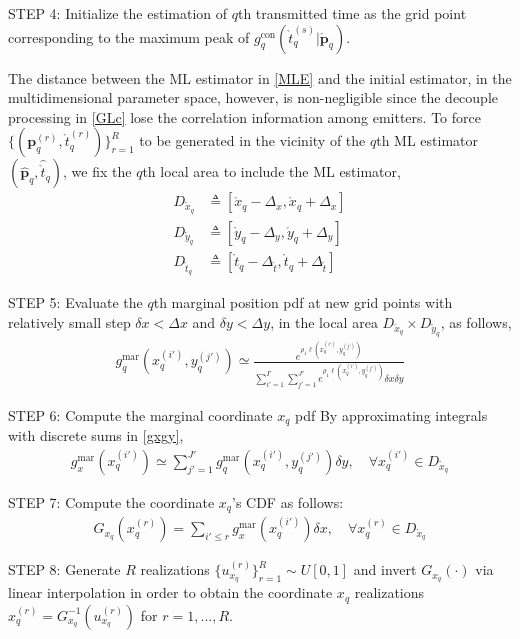\documentclass[review]{elsarticle}
\begin{document}
STEP 4: Initialize the estimation of $q$th transmitted time as the grid point corresponding to the maximum peak of $g_{q}^{\text{con}}(\mathring{t}_q^{(s)} \vert \mathring{\boldsymbol{p}}_q)$.

The distance between the ML estimator in \eqref{MLE} and the initial estimator, in the multidimensional parameter space, however, is non-negligible since the decouple processing in \eqref{GLc} lose the correlation information among emitters. To force $\lbrace(\boldsymbol{p}_q^{(r)},\mathring{t}_q^{(r)})\rbrace_{r=1}^{R}$ to be generated in the vicinity of the $q$th ML estimator $(\hat{\boldsymbol{p}}_q,\hat{\mathring{t}}_q)$, we fix the $q$th local area to include the ML estimator,
\begin{align}
    D_{\mathring{x}_q}&\triangleq[\mathring{x}_q-\Delta_x,\mathring{x}_q+\Delta_x]\\
    D_{\mathring{y}_q}&\triangleq[\mathring{y}_q-\Delta_y,\mathring{y}_q+\Delta_y]\\
    D_{\mathring{t}_q}&\triangleq[\mathring{t}_q-\Delta_{\mathring{t}},\mathring{t}_q+\Delta_{\mathring{t}}]
\end{align}

STEP 5: Evaluate the $q$th marginal position pdf at new grid points with relatively small step $\delta x<\Delta x$ and $\delta y<\Delta y$, in the local area $D_{\mathring{x}_q}\times D_{\mathring{y}_q}$, as follows,
\begin{align}
    g_{q}^{\text{mar}}(x_q^{(i')},y_q^{(j')})\simeq\frac{e^{\rho_1\ell (x_q^{(i')},y_q^{(j')})}}{\sum_{i'=1}^{I'}\sum_{j'=1}^{J'}e^{\rho_1\ell (x_q^{(i')},y_q^{(j')})}\delta x\delta y}
\end{align}

STEP 6: Compute the marginal coordinate $x_q$ pdf By approximating integrals with discrete sums in \eqref{gxgy},
\begin{align}
    g_{x}^{\text{mar}}(x_q^{(i')})\simeq \sum_{j'=1}^{J'} g_{q}^{\text{mar}}(x_q^{(i')},y_q^{(j')})\delta y, \quad \forall x_q^{(i')}\in D_{\mathring{x}_q}
\end{align}

STEP 7: Compute the coordinate $x_q$'s CDF as follows:
\begin{align}\label{Gxq}
    G_{x_q}(x_q^{(r)})=\sum_{i'\leq r} g_{x}^{\text{mar}}(x_q^{(i')})\delta x, \quad \forall x_q^{(r)}\in D_{\mathring{x}_q} 
\end{align}

STEP 8: Generate $R$ realizations $\lbrace u_{x_q}^{(r)}\rbrace_{r=1}^R\sim U[0,1]$ and invert $G_{x_q}(\cdot)$ via linear interpolation in order to obtain the coordinate $x_q$ realizations $x_q^{(r)}=G_{x_q}^{-1}(u_{x_q}^{(r)})$ for $r=1,...,R$.
\end{document}
